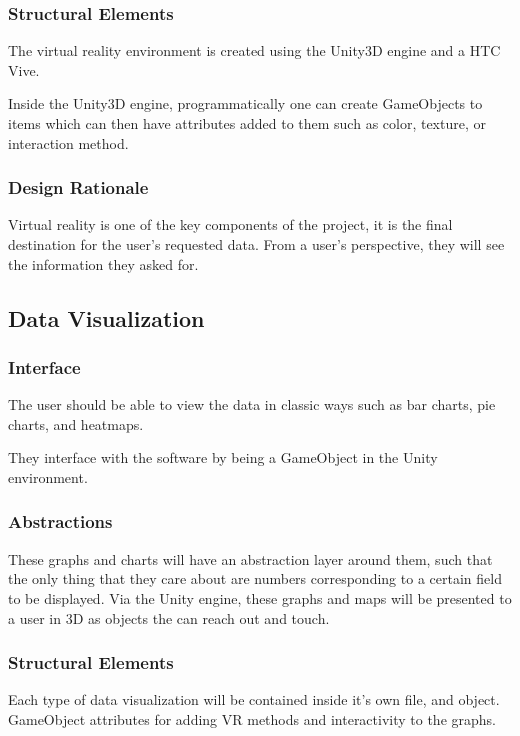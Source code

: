 \documentclass[onecolumn, draftclsnofoot,10pt, compsoc]{IEEEtran}
\begin{document}
        \subsubsection{Structural Elements}
            The virtual reality environment is created using the Unity3D engine and a HTC Vive. 
            
            Inside the Unity3D engine, programmatically one can create GameObjects to items which can then have attributes added to them such as color, texture, or interaction method.
        
        \subsubsection{Design Rationale}
            Virtual reality is one of the key components of the project, it is the final destination for the user{'}s requested data. From a user{'}s perspective, they will see the information they asked for.
        
    \subsection{Data Visualization}
        \subsubsection{Interface}
            The user should be able to view the data in classic ways such as bar charts, pie charts, and heatmaps. 
            
            They interface with the software by being a GameObject in the Unity environment.
        
        \subsubsection{Abstractions}
            These graphs and charts will have an abstraction layer around them, such that the only thing that they care about are numbers corresponding to a certain field to be displayed. 
            Via the Unity engine, these graphs and maps will be presented to a user in 3D as objects the can reach out and touch.

        
        \subsubsection{Structural Elements}
            Each type of data visualization will be contained inside it{'}s own file, and object. 
            GameObject attributes for adding VR methods and interactivity to the graphs.
        
\end{document}
